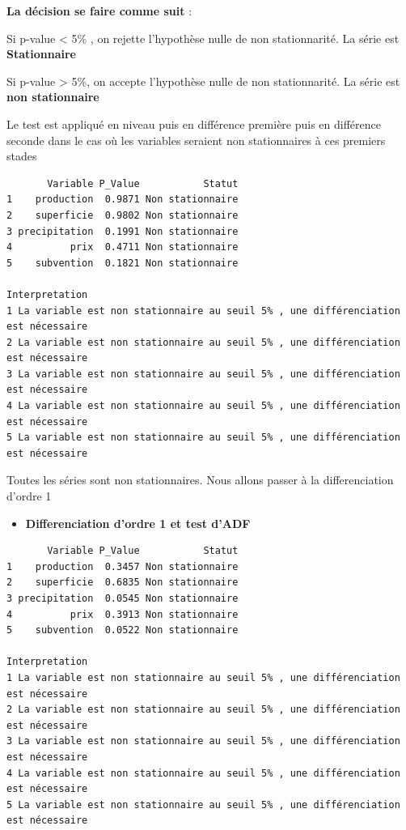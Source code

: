 \documentclass[
  letterpaper,
  DIV=11,
  numbers=noendperiod]{scrartcl}
\providecommand{\tightlist}{%
  \setlength{\itemsep}{0pt}\setlength{\parskip}{0pt}}\usepackage{longtable,booktabs,array}
\begin{document}
\begin{enumerate}
  \textbf{La décision se faire comme suit} :

  Si p-value \textless{} 5\% , on rejette l'hypothèse nulle de non
  stationnarité. La série est \textbf{Stationnaire}

  Si p-value \textgreater{} 5\%, on accepte l'hypothèse nulle de non
  stationnarité. La série est \textbf{non stationnaire}

  Le test est appliqué en niveau puis en différence première puis en
  différence seconde dans le cas où les variables seraient non
  stationnaires à ces premiers stades

\begin{verbatim}
       Variable P_Value           Statut
1    production  0.9871 Non stationnaire
2    superficie  0.9802 Non stationnaire
3 precipitation  0.1991 Non stationnaire
4          prix  0.4711 Non stationnaire
5    subvention  0.1821 Non stationnaire
                                                                     Interpretation
1 La variable est non stationnaire au seuil 5% , une différenciation est nécessaire
2 La variable est non stationnaire au seuil 5% , une différenciation est nécessaire
3 La variable est non stationnaire au seuil 5% , une différenciation est nécessaire
4 La variable est non stationnaire au seuil 5% , une différenciation est nécessaire
5 La variable est non stationnaire au seuil 5% , une différenciation est nécessaire
\end{verbatim}

  Toutes les séries sont non stationnaires. Nous allons passer à la
  differenciation d'ordre 1

  \begin{itemize}
  \tightlist
  \item
    \textbf{Differenciation d'ordre 1 et test d'ADF}
  \end{itemize}

\begin{verbatim}
       Variable P_Value           Statut
1    production  0.3457 Non stationnaire
2    superficie  0.6835 Non stationnaire
3 precipitation  0.0545 Non stationnaire
4          prix  0.3913 Non stationnaire
5    subvention  0.0522 Non stationnaire
                                                                     Interpretation
1 La variable est non stationnaire au seuil 5% , une différenciation est nécessaire
2 La variable est non stationnaire au seuil 5% , une différenciation est nécessaire
3 La variable est non stationnaire au seuil 5% , une différenciation est nécessaire
4 La variable est non stationnaire au seuil 5% , une différenciation est nécessaire
5 La variable est non stationnaire au seuil 5% , une différenciation est nécessaire
\end{verbatim}


\end{enumerate}
\end{document}
